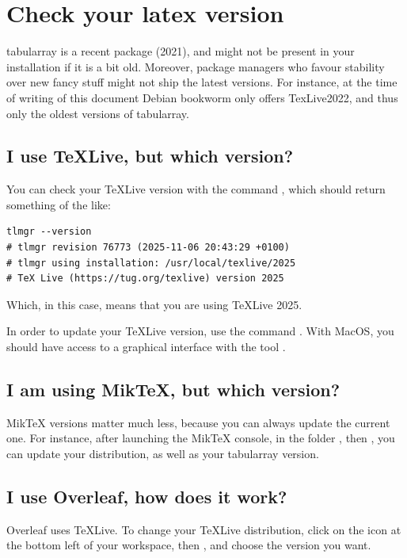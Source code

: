 \chapter{Check your latex version}\label{app:version}

tabularray is a recent package (2021), and might not be present in your installation if it is a bit old. Moreover, package managers who favour stability over new fancy stuff might not ship the latest versions. For instance, at the time of writing of this document Debian bookworm only offers TexLive2022, and thus only the oldest versions of tabularray.

\section{I use TeXLive, but which version?}
You can check your TeXLive version with the command , which should return something of the like:

\begin{verbatim}
tlmgr --version
# tlmgr revision 76773 (2025-11-06 20:43:29 +0100)
# tlmgr using installation: /usr/local/texlive/2025
# TeX Live (https://tug.org/texlive) version 2025
\end{verbatim}

Which, in this case, means that you are using TeXLive 2025.

In order to update your TeXLive version, use the command . With MacOS, you should have access to a graphical interface with the tool .

\section{I am using MikTeX, but which version?}

MikTeX versions matter much less, because you can always update the current one. For instance, after launching the MikTeX console, in the folder , then , you can update your distribution, as well as your tabularray version.

\section{I use Overleaf, how does it work?}

Overleaf uses TeXLive. To change your TeXLive distribution, click on the  icon at the bottom left of your workspace, then , and choose the version you want.

